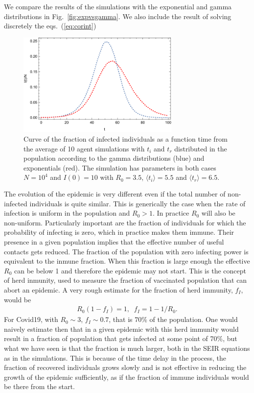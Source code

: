 \documentclass[a4paper,oneside,11pt]{article}
\begin{document}
We compare the results of the simulations with the exponential and gamma distributions in Fig.~\ref{fig:expvsgamma}. We also include the result of solving discretely the eqs.~(\ref{eq:corint})
\begin{figure}[h!]
  \centering
  \includegraphics[width=8cm]{expvsgamma.pdf}
  \caption{ Curve of the fraction of infected individuals as a function time from the average of 10 agent simulations with $t_i$ and $t_r$ distributed in the population according to the gamma distributions (blue) and exponentials (red). The simulation has parameters in both cases $N=10^4$ and $I(0)=10$ with $R_0=3.5$, $\langle t_i\rangle=5.5$ and $\langle t_r\rangle=6.5$.  }
  \label{fig:exp}
   \end{figure}  
   
   The evolution of the epidemic is very different even if the total number of non-infected individuals  is quite similar. This is generically the case when the rate of 
   infection is uniform in the population and $R_0 >1$. In practice $R_0$ will also  be non-uniform. Particularly important are the fraction of individuals for which the probability of infecting is zero, which in practice makes them immune. Their presence in a given population implies that the effective number of useful contacts gets reduced. The fraction of the population with zero infecting power is equivalent to the inmune fraction. When this fraction is large enough the effective $R_0$ can be below 1 and therefore the epidemic may not start. This is the concept of herd inmunity, used to measure the fraction of vaccinated population that can abort an epidemic. A very rough estimate for the fraction of herd immunity, $f_I$, would be
   \begin{eqnarray}
  R_0 (1- f_I)  =1, \;\; f_I= 1-1/R_0. 
   \end{eqnarray} 
   For Covid19, with $R_0 \sim 3$, $f_I \sim 0.7$, that is $70\%$ of the population. One would naively estimate then that in a given epidemic with this herd immunity would result in a 
 fraction of  population that gets infected at some point of 70$\%$, but what we have seen is that the fraction is much larger, both in the SEIR equations as in the simulations. This is because of the time delay in the process, the fraction of recovered individuals grows slowly and is not effective in reducing the growth of the epidemic sufficiently, as if the fraction of immune individuals would be there from the start. 
\end{document}
